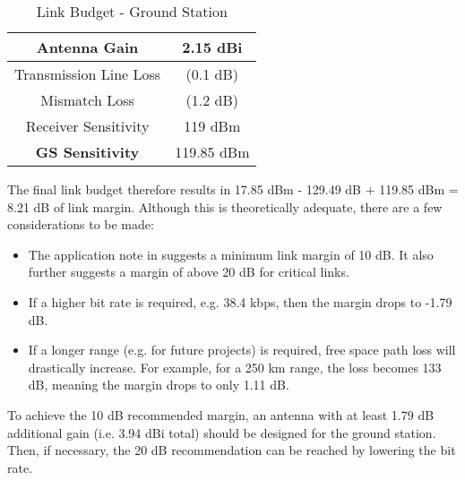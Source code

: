\begin{table}[!htb]
  \centering
  \renewcommand{\arraystretch}{1.2}
  \begin{tabular}{ |c|c| }
  \hline
  Antenna Gain                  & 2.15 dBi        \\ \hline
  Transmission Line Loss        & (0.1 dB)        \\ \hline
  Mismatch Loss                 & (1.2 dB)        \\ \hline
  Receiver Sensitivity          & 119 dBm         \\ \hline
  \textbf{GS Sensitivity}       & 119.85 dBm      \\ \hline
  \end{tabular}
  \caption{Link Budget - Ground Station}
  \label{tab:link_budget_gs}
\end{table}

The final link budget therefore results in 17.85 dBm - 129.49 dB + 119.85 dBm = 8.21 dB of link margin. Although this is theoretically adequate, there are a few considerations to be made:
\begin{itemize}
    \item The application note in \cite{paper-linkBudget} suggests a minimum link margin of 10 dB. It also further suggests a margin of above 20 dB for critical links.
    \item If a higher bit rate is required, e.g. 38.4 kbps, then the margin drops to -1.79 dB.
    \item If a longer range (e.g. for future projects) is required, free space path loss will drastically increase. For example, for a 250 km range, the loss becomes 133 dB, meaning the margin drops to only 1.11 dB.
\end{itemize}

To achieve the 10 dB recommended margin, an antenna with at least 1.79 dB additional gain (i.e. 3.94 dBi total) should be designed for the ground station. Then, if necessary, the 20 dB recommendation can be reached by lowering the bit rate.